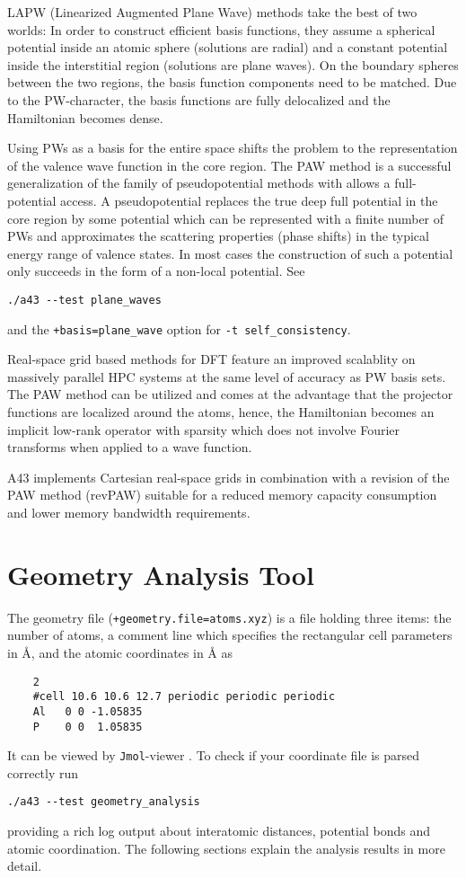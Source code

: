 \documentclass[oribibl]{llncs}
\newcommand{\ttt}[1]{\texttt{#1}}
\newcommand{\codename}{A43}
\begin{document}
LAPW (Linearized Augmented Plane Wave) methods take the best of two worlds:
In order to construct efficient basis functions, 
they assume a spherical potential inside an atomic sphere (solutions are radial)
and a constant potential inside the interstitial region (solutions are plane waves). 
On the boundary spheres between the two regions, the basis function components need to be matched.
Due to the \ac{PW}-character, the basis functions are fully delocalized and 
the Hamiltonian becomes dense.


Using \ac{PW}s as a basis for the entire space shifts the problem to the representation of the valence wave function in the core region.
The \ac{PAW} method is a successful generalization of the family of pseudopotential methods with allows a full-potential access.
A pseudopotential replaces the true deep full potential in the core region
by some potential which can be represented with a finite number of \ac{PW}s
and approximates the scattering properties (phase shifts) in the typical energy
range of valence states.
In most cases the construction of such a potential only succeeds in the form of
a non-local potential. See
\begin{verbatim}
./a43 --test plane_waves
\end{verbatim}
and the \ttt{+basis=plane\_wave} option for \ttt{-t self\_consistency}.


Real-space grid based methods for \ac{DFT}
feature an improved scalablity on massively parallel \ac{HPC} systems at the same level of accuracy as \ac{PW} basis sets. 
The \ac{PAW} method can be utilized and comes at the advantage that the projector functions are localized around the atoms, 
hence, the Hamiltonian becomes an implicit low-rank operator with sparsity which does not involve Fourier transforms when applied to a wave function.


\codename{} implements Cartesian real-space grids 
in combination with a revision of the \ac{PAW} method (revPAW) suitable for
a reduced memory capacity consumption and lower memory bandwidth requirements.



\section{Geometry Analysis Tool} \label{sec:geometry-analysis}
%
The geometry file (\ttt{+geometry.file=atoms.xyz}) is a file
holding three items:
the number of atoms, 
a comment line which specifies the rectangular cell parameters in \AA{}, 
and the atomic coordinates in \AA{} as
\begin{verbatim}
    2
    #cell 10.6 10.6 12.7 periodic periodic periodic
    Al   0 0 -1.05835
    P    0 0  1.05835
\end{verbatim}
It can be viewed by \ttt{Jmol}-viewer \cite{jmol-software}.
%
\noindent
To check if your coordinate file is parsed correctly run
\begin{verbatim}
./a43 --test geometry_analysis
\end{verbatim}
providing a rich log output about interatomic distances,
potential bonds and atomic coordination. 
The following sections explain the analysis results in more detail.
\end{document}
